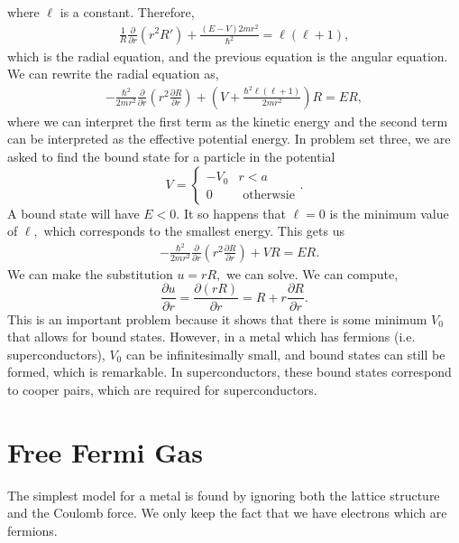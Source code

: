 \documentclass{article}
\numberwithin{equation}{section}
\begin{document}
where $\ell$ is a constant. Therefore, 
\begin{align*}
    \frac{1}{R}\frac{\partial}{\partial r}(r^2R') + \frac{(E-V)2mr^2}{\hbar^2} = \ell(\ell + 1),
\end{align*}
which is the radial equation, and the previous equation is the angular equation. We can rewrite the radial equation as,
\begin{align*}
    -\frac{\hbar^2}{2mr^2}\frac{\partial}{\partial r}\left(r^2 \frac{\partial R}{\partial r}\right) + \left(V+\frac{\hbar^2\ell(\ell+1)}{2mr^2}\right)R=ER,
\end{align*}
where we can interpret the first term as the kinetic energy and the second term can be interpreted as the effective potential energy. In problem set three, we are asked to find the bound state for a particle in the potential 
\begin{equation*}
    V = \begin{cases}
        -V_0 & r<a \\ 
        0 & \text{ otherwsie}
    \end{cases}.
\end{equation*}
A bound state will have $E<0.$ It so happens that $\ell=0$ is the minimum value of $\ell,$ which corresponds to the smallest energy. This gets us 
\begin{align*}
    &-\frac{\hbar^2}{2mr^2}\frac{\partial}{\partial r}\left(r^2\frac{\partial R}{\partial r}\right) + VR = ER. 
\end{align*}
We can make the substitution $u = rR,$ we can solve. We can compute,
\begin{equation*}
    \frac{\partial u}{\partial r} = \frac{\partial (rR)}{\partial r} = R + r\frac{\partial R}{\partial r}.
\end{equation*}
This is an important problem because it shows that there is some minimum $V_0$ that allows for bound states. However, in a metal which has fermions (i.e. superconductors), $V_0$ can be infinitesimally small, and bound states can still be formed, which is remarkable. In superconductors, these bound states correspond to cooper pairs, which are required for superconductors.
\section{Free Fermi Gas}
The simplest model for a metal is found by ignoring both the lattice structure and the Coulomb force. We only keep the fact that we have electrons which are fermions.
\end{document}
